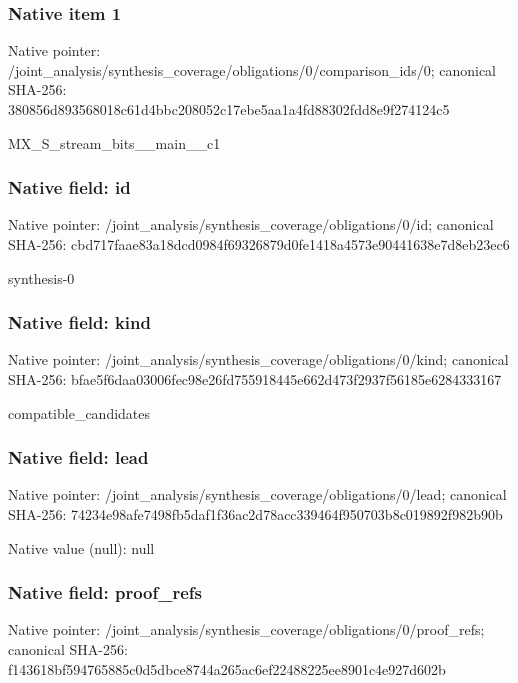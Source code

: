 \documentclass[10pt,a4paper]{article}
\begin{document}
\subsubsection{Native item 1}
Native pointer: /joint\_\allowbreak{}analysis/synthesis\_\allowbreak{}coverage/obligations/0/comparison\_\allowbreak{}ids/0; canonical SHA-256: 380856d893568018c61d4bbc208052c17ebe5aa1a4fd88302fdd8e9f274124c5

\begingroup\raggedright\sloppy MX\_\allowbreak{}S\_\allowbreak{}stream\_\allowbreak{}bits\_\allowbreak{}\_\allowbreak{}main\_\allowbreak{}\_\allowbreak{}c1\par\endgroup

\subsubsection{Native field: id}
Native pointer: /joint\_\allowbreak{}analysis/synthesis\_\allowbreak{}coverage/obligations/0/id; canonical SHA-256: cbd717faae83a18dcd0984f69326879d0fe1418a4573e90441638e7d8eb23ec6

\begingroup\raggedright\sloppy synthesis-0\par\endgroup

\subsubsection{Native field: kind}
Native pointer: /joint\_\allowbreak{}analysis/synthesis\_\allowbreak{}coverage/obligations/0/kind; canonical SHA-256: bfae5f6daa03006fec98e26fd755918445e662d473f2937f56185e6284333167

\begingroup\raggedright\sloppy compatible\_\allowbreak{}candidates\par\endgroup

\subsubsection{Native field: lead}
Native pointer: /joint\_\allowbreak{}analysis/synthesis\_\allowbreak{}coverage/obligations/0/lead; canonical SHA-256: 74234e98afe7498fb5daf1f36ac2d78acc339464f950703b8c019892f982b90b

Native value (null): null

\subsubsection{Native field: proof\_\allowbreak{}refs}
Native pointer: /joint\_\allowbreak{}analysis/synthesis\_\allowbreak{}coverage/obligations/0/proof\_\allowbreak{}refs; canonical SHA-256: f143618bf594765885c0d5dbce8744a265ac6ef22488225ee8901c4e927d602b
\end{document}
